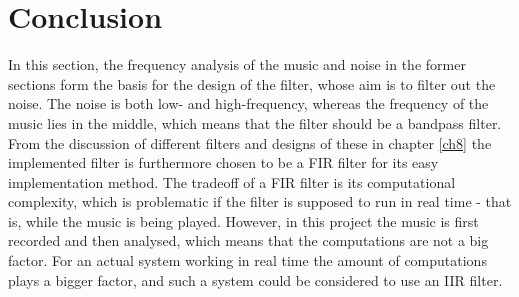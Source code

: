 \section{Conclusion}\label{sec:filtervalg}
In this section, the frequency analysis of the music and noise in the former sections form the basis for the design of the filter, whose aim is to filter out the noise. The noise is both low- and high-frequency, whereas the frequency of the music lies in the middle, which means that the filter should be a bandpass filter. From the discussion of different filters and designs of these in chapter \ref{ch8} the implemented filter is furthermore chosen to be a FIR filter for its easy implementation method. The tradeoff of a FIR filter is its computational complexity, which is problematic if the filter is supposed to run in real time - that is, while the music is being played. However, in this project the music is first recorded and then analysed, which means that the computations are not a big factor. For an actual system working in real time the amount of computations plays a bigger factor, and such a system could be considered to use an IIR filter.
